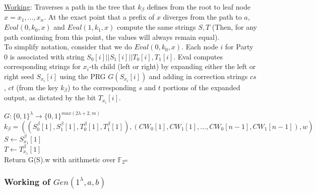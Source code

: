 \noindent \underline{Working}: Traverses a path in the tree that $k_{\beta}$ defines from the root to leaf node $x = x_1, ..., x_n$. At the exact point that a prefix of $x$ diverges from the path to $a$, $Eval(0, k_0, x)$ and $Eval(1, k_1, x)$ compute the same strings $S, T$ (Then, for any path continuing from this point, the values will always remain equal). \\

To simplify notation, consider that we do $Eval(0, k_0, x)$. Each node $i$ for Party 0 is associated with string $S_0[i] || S_1[i] || T_0[i], T_1[i]$. Eval computes corresponding strings for $x_i$-th child (left or right) by expanding either the left or right seed $S_{x_i}[i]$ using the PRG $G(S_{x_i}[i])$ and adding in correction strings $cs$, $ct$ (from the key $k_{\beta}$) to the corresponding $s$ and $t$ portions of the expanded output, as dictated by the bit $T_{x_i}[i]$.

\begin{algorithm}[H]
    \KwOut{}
    $G: \{0, 1\}^{\lambda} \rightarrow \{0, 1\}^{max(2\lambda + 2, m)}$ \\
    $k_{\beta} = ((S_0^{\beta}[1], S_1^{\beta}[1], T_0^{\beta}[1], T_1^{\beta}[1]), (CW_0[1], CW_1[1], ..., CW_0[n-1], CW_1[n-1]), w)$ \\
    $S \leftarrow S_{x_1}^{\beta}[1]$ \\
    $T \leftarrow T_{x_1}^{\beta}[1]$ \\
    Return G(S).w with arithmetic over $\mathbb{F}_{2^m}$
\end{algorithm}

\subsubsection{Working of $Gen(1^{\lambda}, a, b)$}

